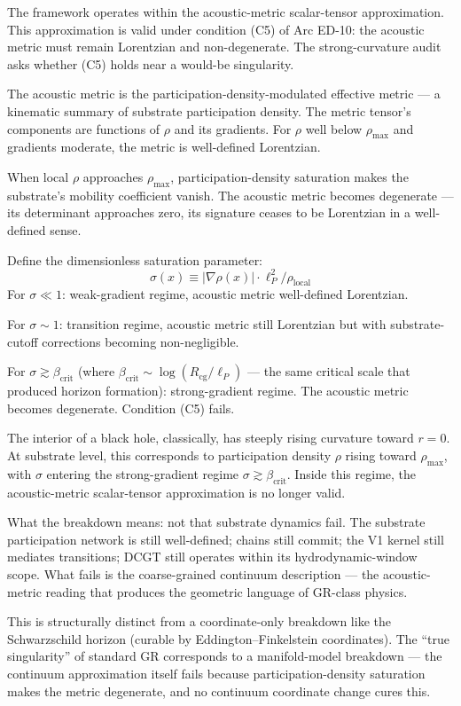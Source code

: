 \documentclass[11pt,a4paper]{article}
\begin{document}
The framework operates within the acoustic-metric scalar-tensor approximation. This approximation is valid under condition (C5) of Arc ED-10: the acoustic metric must remain Lorentzian and non-degenerate. The strong-curvature audit asks whether (C5) holds near a would-be singularity.

The acoustic metric is the participation-density-modulated effective metric --- a kinematic summary of substrate participation density. The metric tensor's components are functions of $\rho$ and its gradients. For $\rho$ well below $\rho_{\mathrm{max}}$ and gradients moderate, the metric is well-defined Lorentzian.

When local $\rho$ approaches $\rho_{\mathrm{max}}$, participation-density saturation makes the substrate's mobility coefficient vanish. The acoustic metric becomes degenerate --- its determinant approaches zero, its signature ceases to be Lorentzian in a well-defined sense.

Define the dimensionless saturation parameter:
\[
\sigma(x) \equiv |\nabla\rho(x)| \cdot \ell_P^{2} / \rho_{\mathrm{local}}
\]
For $\sigma \ll 1$: weak-gradient regime, acoustic metric well-defined Lorentzian.

For $\sigma \sim 1$: transition regime, acoustic metric still Lorentzian but with substrate-cutoff corrections becoming non-negligible.

For $\sigma \gtrsim \beta_{\mathrm{crit}}$ (where $\beta_{\mathrm{crit}} \sim \log(R_{\mathrm{cg}}/\ell_P)$ --- the same critical scale that produced horizon formation): strong-gradient regime. The acoustic metric becomes degenerate. Condition (C5) fails.

The interior of a black hole, classically, has steeply rising curvature toward $r = 0$. At substrate level, this corresponds to participation density $\rho$ rising toward $\rho_{\mathrm{max}}$, with $\sigma$ entering the strong-gradient regime $\sigma \gtrsim \beta_{\mathrm{crit}}$. Inside this regime, the acoustic-metric scalar-tensor approximation is no longer valid.

What the breakdown means: not that substrate dynamics fail. The substrate participation network is still well-defined; chains still commit; the V1 kernel still mediates transitions; DCGT still operates within its hydrodynamic-window scope. What fails is the coarse-grained continuum description --- the acoustic-metric reading that produces the geometric language of GR-class physics.

This is structurally distinct from a coordinate-only breakdown like the Schwarzschild horizon (curable by Eddington--Finkelstein coordinates). The ``true singularity'' of standard GR corresponds to a manifold-model breakdown --- the continuum approximation itself fails because participation-density saturation makes the metric degenerate, and no continuum coordinate change cures this.
\end{document}
